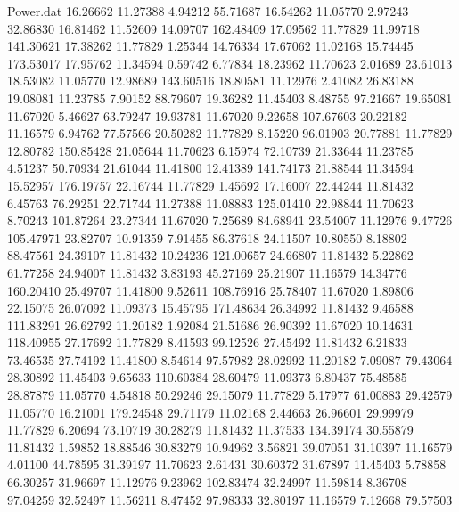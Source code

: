 \begin{filecontents}{Power.dat}
  16.26662   11.27388    4.94212   55.71687
  16.54262   11.05770    2.97243   32.86830
  16.81462   11.52609   14.09707  162.48409
  17.09562   11.77829   11.99718  141.30621
  17.38262   11.77829    1.25344   14.76334
  17.67062   11.02168   15.74445  173.53017
  17.95762   11.34594    0.59742    6.77834
  18.23962   11.70623    2.01689   23.61013
  18.53082   11.05770   12.98689  143.60516
  18.80581   11.12976    2.41082   26.83188
  19.08081   11.23785    7.90152   88.79607
  19.36282   11.45403    8.48755   97.21667
  19.65081   11.67020    5.46627   63.79247
  19.93781   11.67020    9.22658  107.67603
  20.22182   11.16579    6.94762   77.57566
  20.50282   11.77829    8.15220   96.01903
  20.77881   11.77829   12.80782  150.85428
  21.05644   11.70623    6.15974   72.10739
  21.33644   11.23785    4.51237   50.70934
  21.61044   11.41800   12.41389  141.74173
  21.88544   11.34594   15.52957  176.19757
  22.16744   11.77829    1.45692   17.16007
  22.44244   11.81432    6.45763   76.29251
  22.71744   11.27388   11.08883  125.01410
  22.98844   11.70623    8.70243  101.87264
  23.27344   11.67020    7.25689   84.68941
  23.54007   11.12976    9.47726  105.47971
  23.82707   10.91359    7.91455   86.37618
  24.11507   10.80550    8.18802   88.47561
  24.39107   11.81432   10.24236  121.00657
  24.66807   11.81432    5.22862   61.77258
  24.94007   11.81432    3.83193   45.27169
  25.21907   11.16579   14.34776  160.20410
  25.49707   11.41800    9.52611  108.76916
  25.78407   11.67020    1.89806   22.15075
  26.07092   11.09373   15.45795  171.48634
  26.34992   11.81432    9.46588  111.83291
  26.62792   11.20182    1.92084   21.51686
  26.90392   11.67020   10.14631  118.40955
  27.17692   11.77829    8.41593   99.12526
  27.45492   11.81432    6.21833   73.46535
  27.74192   11.41800    8.54614   97.57982
  28.02992   11.20182    7.09087   79.43064
  28.30892   11.45403    9.65633  110.60384
  28.60479   11.09373    6.80437   75.48585
  28.87879   11.05770    4.54818   50.29246
  29.15079   11.77829    5.17977   61.00883
  29.42579   11.05770   16.21001  179.24548
  29.71179   11.02168    2.44663   26.96601
  29.99979   11.77829    6.20694   73.10719
  30.28279   11.81432   11.37533  134.39174
  30.55879   11.81432    1.59852   18.88546
  30.83279   10.94962    3.56821   39.07051
  31.10397   11.16579    4.01100   44.78595
  31.39197   11.70623    2.61431   30.60372
  31.67897   11.45403    5.78858   66.30257
  31.96697   11.12976    9.23962  102.83474
  32.24997   11.59814    8.36708   97.04259
  32.52497   11.56211    8.47452   97.98333
  32.80197   11.16579    7.12668   79.57503

\end{filecontents}
